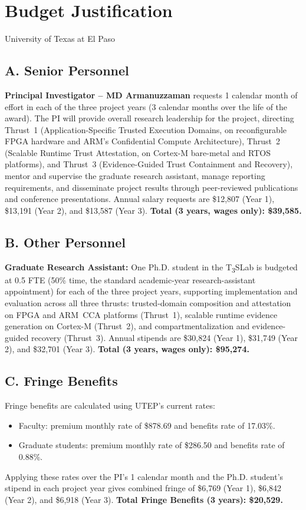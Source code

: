 \documentclass[11pt,onecolumn]{article}
\begin{document}
\section*{Budget Justification}
\noindent University of Texas at El Paso

\subsection*{A. Senior Personnel}
\textbf{Principal Investigator -- MD Armanuzzaman} requests 1 calendar month of effort in each of the three project years (3 calendar months over the life of the award).
The PI will provide overall research leadership for the project, directing Thrust~1 (Application-Specific Trusted Execution Domains, on reconfigurable FPGA hardware and ARM's
Confidential Compute Architecture), Thrust~2 (Scalable Runtime Trust Attestation, on Cortex-M bare-metal and RTOS platforms), and Thrust~3 (Evidence-Guided Trust Containment and Recovery), mentor and supervise the graduate research assistant, manage reporting requirements, and disseminate project results through peer-reviewed publications and conference presentations.
Annual salary requests are \$12,807 (Year 1), \$13,191 (Year 2), and \$13,587 (Year 3).
\textbf{Total (3 years, wages only): \$39,585.}

\subsection*{B. Other Personnel}
\textbf{Graduate Research Assistant:} One Ph.D. student in the T\textsubscript{3}SLab is
budgeted at 0.5 FTE (50\% time, the standard academic-year research-assistant appointment)
for each of the three project years, supporting implementation and evaluation across all three
thrusts: trusted-domain composition and attestation on FPGA and ARM~CCA platforms (Thrust~1),
scalable runtime evidence generation on Cortex-M (Thrust~2), and compartmentalization and
evidence-guided recovery (Thrust~3). Annual stipends are \$30,824 (Year 1), \$31,749 (Year 2), and \$32,701 (Year 3).
\textbf{Total (3 years, wages only): \$95,274.}

\subsection*{C. Fringe Benefits}
Fringe benefits are calculated using UTEP's current rates:
\begin{itemize}
	\item Faculty: premium monthly rate of \$878.69 and benefits rate of 17.03\%.
	\item Graduate students: premium monthly rate of \$286.50 and benefits rate of 0.88\%.
\end{itemize}
Applying these rates over the PI's 1 calendar month and the Ph.D. student's stipend in each
project year gives combined fringe of \$6,769 (Year 1), \$6,842 (Year 2), and \$6,918 (Year 3).
\textbf{Total Fringe Benefits (3 years): \$20,529.}
\end{document}
